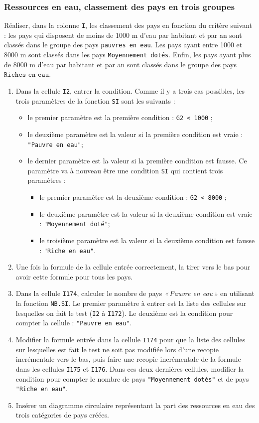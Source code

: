 \subsubsection{Ressources en eau, classement des pays en trois groupes}

Réaliser, dans la colonne \texttt{I}, les classement des pays en fonction du critère suivant : les pays qui disposent de moins de 1000 m d'eau par habitant et par an sont classés dans le groupe des pays \texttt{pauvres en eau}. Les pays ayant entre 1000 et 8000 m sont classés dans les pays \texttt{Moyennement dotés}. Enfin, les pays ayant plus de 8000 m d'eau par habitant et par an sont classés dans le groupe des pays $\texttt{Riches en eau}$.
\begin{enumerate}
\item Dans la cellule \texttt{I2}, entrer la condition. Comme il y a trois cas possibles, les trois paramètres de la fonction \texttt{SI} sont les suivants :
  \begin{itemize}
    \item le premier paramètre est la première condition : \texttt{G2 < 1000} ;
    \item le deuxième paramètre est la valeur si la première condition est vraie : \texttt{"Pauvre en eau"};
    \item le dernier paramètre est la valeur si la première condition est fausse. Ce paramètre va à nouveau être une condition \texttt{SI} qui contient trois paramètres :
\begin{itemize}
 \item le premier paramètre est la deuxième condition : \texttt{G2 < 8000} ;
 \item le deuxième paramètre est la valeur si la deuxième condition est vraie : \texttt{"Moyennement doté"};
 \item le troisième paramètre est la valeur si la deuxième condition est fausse : \texttt{"Riche en eau"}.
\end{itemize}  
  \end{itemize}
\item Une fois la formule de la cellule entrée correctement, la tirer vers le bas pour avoir cette formule pour tous les pays.
\item Dans la cellule \texttt{I174}, calculer le nombre de pays \emph{«\,Pauvre en eau\,»} en utilisant la fonction \texttt{NB.SI}. Le premier paramètre à entrer est la liste des cellules sur lesquelles on fait le test (\texttt{I2} à \texttt{I172}). Le deuxième est la condition pour compter la cellule : \texttt{"Pauvre en eau"}.
\item Modifier la formule entrée dans la cellule \texttt{I174} pour que la liste des cellules sur lesquelles est fait le test ne soit pas modifiée lors d'une recopie incrémentale vers le bas, puis faire une recopie incrémentale de la formule dans les cellules \texttt{I175} et \texttt{I176}. Dans ces deux dernières cellules, modifier la condition pour compter le nombre de pays \texttt{"Moyennement dotés"} et de pays \texttt{"Riche en eau"}.
\item Insérer un diagramme circulaire représentant la part des ressources en eau des trois catégories de pays créées.
\end{enumerate}

